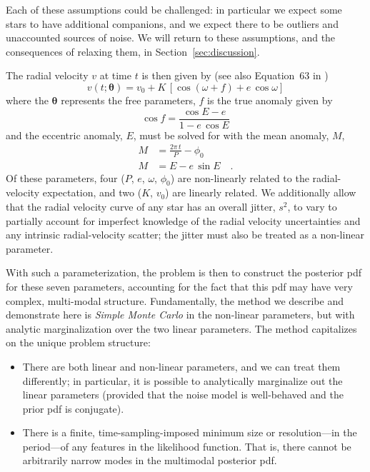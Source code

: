 \documentclass[manuscript, letterpaper]{aastex6}
\newcommand{\sectionname}{Section}
\newcommand{\eqname}{Equation}
\newcommand{\bs}[1]{\boldsymbol{#1}}
\begin{document}
Each of these assumptions could be challenged: in particular we expect some stars
to have additional companions, and we expect there to be outliers and
unaccounted sources of noise.
We will return to these assumptions, and the consequences of relaxing them, in
\sectionname~\ref{sec:discussion}.

The radial velocity $v$ at time $t$ is then given by (see also \eqname~63 in
\citealt{Murray:2010})
\begin{equation}
  v(t;\bs{\theta}) = v_0 + K\,[\cos(\omega + f) + e\,\cos\omega]
\end{equation}
where the $\bs{\theta}$ represents the free parameters, $f$ is the true anomaly
given by
\begin{equation}
  \cos f = \frac{\cos E - e}{1 - e\, \cos E}
\end{equation}
and the eccentric anomaly, $E$, must be solved for with the mean
anomaly, $M$,
\begin{align}
  M &= \frac{2\pi\, t}{P} - \phi_0\\
  M &= E - e\,\sin E \quad .
\end{align}
Of these parameters, four ($P$, $e$, $\omega$, $\phi_0$) are non-linearly
related to the radial-velocity expectation, and two ($K$, $v_0$) are
linearly related.
We additionally allow that the radial velocity curve of any star has an overall
jitter, $s^2$, to vary to partially account for
imperfect knowledge of the radial velocity uncertainties and any intrinsic
radial-velocity scatter; the jitter must also be treated as a non-linear
parameter.

With such a parameterization, the problem is then to construct the posterior pdf
for these seven parameters, accounting for the fact that this pdf
may have very complex, multi-modal structure.
Fundamentally, the method we describe and demonstrate here is
\emph{Simple Monte Carlo} in the non-linear parameters, but with analytic
marginalization over the two linear parameters.
The method capitalizes on the unique problem structure:
\begin{itemize}\itemsep0ex
\item There are both linear and non-linear parameters, and we can
  treat them differently; in particular, it is possible to
  analytically marginalize out the linear parameters (provided that the
  noise model is well-behaved and the prior pdf is conjugate).
\item There is a finite, time-sampling-imposed minimum size or
  resolution---in the period---of any features in the
  likelihood function. That is, there cannot be arbitrarily narrow
  modes in the multimodal posterior pdf.
\end{itemize}
\end{document}
